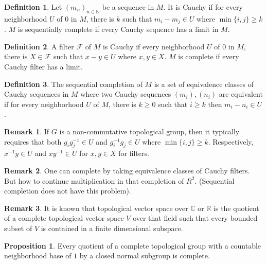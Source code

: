 \documentclass[10pt]{article}
\numberwithin{equation}{section}
\theoremstyle{definition}
\newtheorem{proposition}{Proposition}[subsection]
\newtheorem{definition}{Definition}[subsection]
\newtheorem{remark}{Remark}[subsection]
\newcommand{\N}[0]{\mathbb{N}}
\newcommand{\R}[0]{\mathbb{R}}
\newcommand{\C}[0]{\mathbb{C}}
\begin{document}
\begin{definition}
    \label{definition_11_5_1}
    Let $(m_n)_{n\in\N}$ be a sequence in $M$. It is Cauchy if for every neighborhood $U$ of $0$ in $M$, there is $k$ such that $m_i-m_j\in U$ where $\min\{i,j\}\geq k$. $M$ is sequentially complete if every Cauchy sequence has a limit in $M$.
\end{definition}
\begin{definition}
    \label{definition_11_5_2}
    A filter $\mathcal{F}$ of $M$ is Cauchy if every neighborhood $U$ of $0$ in $M$, there is $X\in\mathcal{F}$ such that $x-y\in U$ where $x,y\in X$. $M$ is complete if every Cauchy filter has a limit.
\end{definition}
\begin{definition}
    \label{definition_11_5_3}
    The sequential completion of $M$ is a set of equivalence classes of Cauchy sequences in $M$ where two Cauchy sequences $(m_i),(n_i)$ are equivalent if for every neighborhood $U$ of $M$, there is $k\geq0$ such that $i\geq k$ then $m_i-n_i\in U$.
\end{definition}
\begin{remark}
    If $G$ is a non-commutative topological group, then it typically requires that both $g_ig_j^{-1}\in U$ and $g_i^{-1}g_j\in U$ where $\min\{i,j\}\geq k$. Respectively, $x^{-1}y\in U$ and $xy^{-1}\in U$ for $x,y\in X$ for filters.
\end{remark}
\begin{remark}
    One can complete by taking equivalence classes of Cauchy filters. But how to continue multiplication in that completion of $R^2$. (Sequential completion does not have this problem).
\end{remark}
\begin{remark}
    It is known that topological vector space over $\C$ or $\R$ is the quotient of a complete topological vector space $V$ over that field such that every bounded subset of $V$ is contained in a finite dimensional subspace.
\end{remark}
\begin{proposition}
    \label{fact_11_7}
    Every quotient of a complete topological group with a countable neighborhood base of $1$ by a closed normal subgroup is complete.
\end{proposition}
\end{document}
